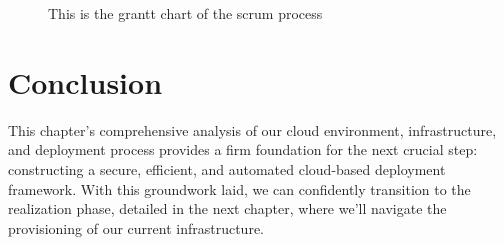 \begin{figure}
    \centering
    \caption{This is the grantt chart of the scrum process}
    \label{fig:grantt_chart}
\end{figure}

\section*{Conclusion}
This chapter's comprehensive analysis of our cloud environment, infrastructure, and deployment process provides a firm foundation for the next crucial step: constructing a secure, efficient, and automated cloud-based deployment framework. With this groundwork laid, we can confidently transition to the realization phase, detailed in the next chapter, where we'll navigate the provisioning of our current infrastructure.

